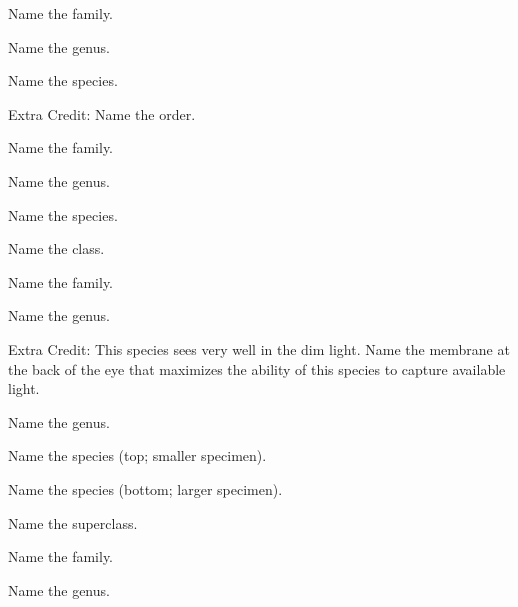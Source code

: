 \documentclass{exam}
\begin{document}
\begin{questions}

{\Large
\question Name the family.
\vspace{0.5\baselineskip}

\question Name the genus.
\vspace{0.5\baselineskip}

\question Name the species.
\vspace{0.5\baselineskip}

Extra Credit: Name the order.
\vspace{2\baselineskip}

%


\question Name the family.
\vspace{0.5\baselineskip}

\question Name the genus.
\vspace{0.5\baselineskip}

\question Name the species.
\vspace{2\baselineskip}
%


\question Name the class.
\vspace{0.5\baselineskip}

\question Name the family.
\vspace{0.5\baselineskip}

\question Name the genus.
\vspace{0.5\baselineskip}

Extra Credit: This species sees very well in the dim light. Name the membrane at the back of the eye that maximizes the ability of this species to capture available light.
\vspace{2\baselineskip}
%


\question Name the genus.
\vspace{0.5\baselineskip}

\question Name the species (top; smaller specimen).
\vspace{0.5\baselineskip}

\question Name the species (bottom; larger specimen).
\vspace{2\baselineskip}
%

%
\question Name the superclass.
\vspace{0.5\baselineskip}

\question Name the family.
\vspace{0.5\baselineskip}

\question Name the genus.
\vspace{2\baselineskip}
%

}
\end{questions}
\end{document}
